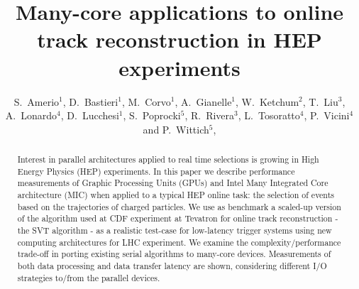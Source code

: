 \documentclass[a4]{jpconf}
\begin{document}
\title{Many-core applications to online track reconstruction in HEP experiments}
\author{S.~Amerio$^1$, 
  D.~Bastieri$^1$, 
  M.~Corvo$^1$, 
  A.~Gianelle$^1$, 
  W.~Ketchum$^2$,
  T.~Liu$^3$, 
  A.~Lonardo$^4$, 
  D.~Lucchesi$^1$,
  S.~Poprocki$^5$, 
  R.~Rivera$^3$, 
  L.~Tosoratto$^4$,
  P.~Vicini$^4$
  and 
  P.~Wittich$^5$,
}
\address{$^1$ INFN and University of Padova, Padova, Italy}
\address{$^2$ Los Alamos National Laboratory, Los Alamos, New Mexico, USA}
\address{$^3$ Fermi National Accelerator Laboratory, Batavia, Illinois, USA}
\address{$^4$ INFN Roma, Rome, Italy}
\address{$^5$ Cornell University, Ithaca, New York, USA}


\begin{abstract}
  Interest in parallel architectures applied to real time selections is 
  growing in High Energy Physics (HEP) experiments. In this paper we describe
  performance measurements of Graphic Processing Units (GPUs) and Intel Many
  Integrated Core architecture (MIC) when applied to a typical HEP online task: 
  the selection of events based on the trajectories of charged particles.
  We use as benchmark a scaled-up version of the algorithm used at CDF 
  experiment at Tevatron for online track reconstruction - the SVT algorithm - 
  as a realistic  test-case for low-latency trigger systems using new computing
  architectures for LHC experiment. We examine the
  complexity/performance trade-off in porting existing serial
  algorithms to many-core devices. Measurements of both data processing 
  and data transfer latency are shown, considering different I/O strategies 
  to/from the parallel devices. 
\end{abstract}
\end{document}
